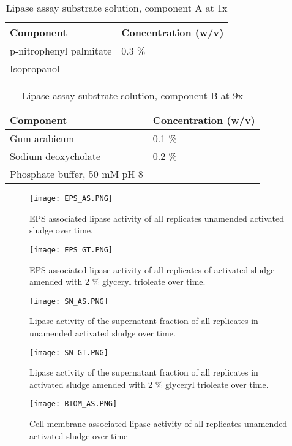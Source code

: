 \documentclass[twoside]{article}
\begin{document}
\begin{table}
\caption{Lipase assay substrate solution, component A at 1x}
\begin{tabular}{  p{6.9cm} | p{6.9cm} }
\hline
Component & Concentration (w/v) \\
\hline
 p-nitrophenyl palmitate   & 0.3 \% \\
 Isopropanol &  \\
 \hline
\end{tabular}
\end{table}

\begin{table}
\caption{Lipase assay substrate solution, component B at 9x}
\begin{tabular}{  p{6.9cm} | p{6.9cm} }
\hline
Component & Concentration (w/v) \\
\hline
 Gum arabicum & 0.1 \% \\
  Sodium deoxycholate & 0.2 \% \\
  Phosphate buffer, 50 mM pH 8   &  \\
  \hline
\end{tabular}
\end{table}

\begin{figure}
\texttt{[image: EPS\_AS.PNG]}
\caption{EPS associated lipase activity of all replicates unamended activated sludge over time.}
\end{figure}

\begin{figure}
\texttt{[image: EPS\_GT.PNG]}
\caption{EPS associated lipase activity of all replicates of activated sludge amended with 2 \% glyceryl trioleate over time.}
\end{figure}

\begin{figure}
\texttt{[image: SN\_AS.PNG]}
\caption{Lipase activity of the supernatant fraction of all replicates in unamended activated sludge over time.}
\end{figure}
\begin{figure}
\texttt{[image: SN\_GT.PNG]}
\caption{Lipase activity of the supernatant fraction of all replicates in activated sludge amended with 2 \% glyceryl trioleate over time.}
\end{figure}

\begin{figure}
\texttt{[image: BIOM\_AS.PNG]}
\caption{Cell membrane associated lipase activity of all replicates unamended activated sludge over time}
\end{figure}
\end{document}
